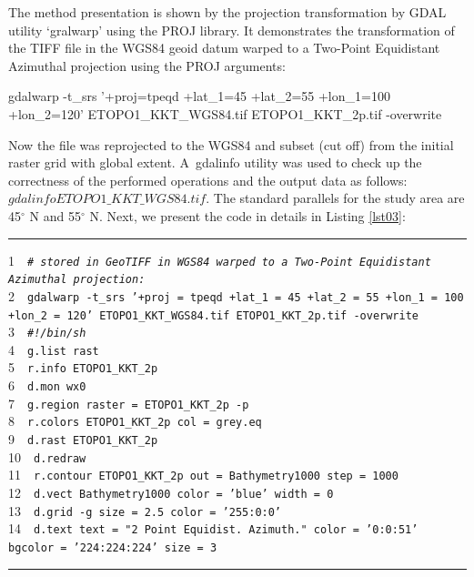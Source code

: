 \documentclass[technologies,article,accept,pdftex,moreauthors]{Definitions/mdpi}
\begin{document}
The method presentation is shown by the projection transformation by GDAL utility ‘gralwarp’ using the PROJ library. It demonstrates the transformation of the TIFF file in the WGS84 geoid datum warped to a Two-Point Equidistant Azimuthal projection using the PROJ arguments: 

\begin{spverbatim}
gdalwarp -t_srs '+proj=tpeqd +lat_1=45 +lat_2=55 +lon_1=100 +lon_2=120' 
ETOPO1_KKT_WGS84.tif ETOPO1_KKT_2p.tif -overwrite
\end{spverbatim}

Now the file was reprojected to the WGS84 and subset (cut off) from the initial raster grid with global extent. A~gdalinfo utility was used to check up the correctness of the performed operations and the output data as follows: $gdalinfo ETOPO1\_KKT\_WGS84.tif.$ {The standard parallels for the study area are }45$^{\circ}$ N and 55$^{\circ}${ N. }Next, we present the code in details in Listing \ref{lst03}:

\begin{listing}[H]
\caption{GRASS GIS %
 script for plotting 2-Point Equidistant Azimuthal projection.}\label{lst03}
\rule{\columnwidth}{1pt}
\raggedright
1~~\texttt{\emph{\# stored in GeoTIFF in WGS84 warped to a Two-Point Equidistant Azimuthal projection:\\}}
2~~\texttt{gdalwarp -t\_srs '+proj = tpeqd +lat\_1 = 45 +lat\_2 = 55 +lon\_1 = 100 +lon\_2 = 120' ETOPO1\_KKT\_WGS84.tif ETOPO1\_KKT\_2p.tif -overwrite\\}
3~~\texttt{\emph{\#!/bin/sh\\}}
4~~\texttt{g.list rast\\}
5~~\texttt{r.info ETOPO1\_KKT\_2p\\}
6~~\texttt{d.mon wx0\\}
7~~\texttt{g.region raster = ETOPO1\_KKT\_2p -p\\}
8~~\texttt{r.colors ETOPO1\_KKT\_2p col = grey.eq\\}
9~~\texttt{d.rast ETOPO1\_KKT\_2p\\}
10~~\texttt{d.redraw\\}
11~~\texttt{r.contour ETOPO1\_KKT\_2p out = Bathymetry1000 step = 1000\\}
12~~\texttt{d.vect Bathymetry1000 color = 'blue' width = 0\\}
13~~\texttt{d.grid -g size = 2.5 color = '255:0:0'\\}
14~~\texttt{d.text text = "2 Point Equidist. Azimuth." color = '0:0:51' bgcolor = '224:224:224' size = 3\\}
\rule{\columnwidth}{1pt}
\end{listing}
\end{document}
